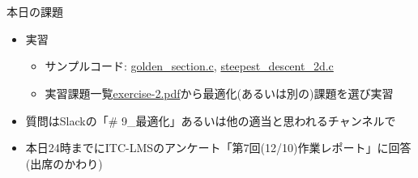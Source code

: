 \documentclass[10pt,dvipdfmx]{beamer}
\begin{document}
\section{}



\begin{frame}[t]{本日の課題}
  \begin{itemize}
  \item 実習
    \begin{itemize}
    \item サンプルコード: \href{https://github.com/todo-group/computer-experiments/blob/master/exercise/optimization/golden_section.c}{golden\_section.c}, \href{https://github.com/todo-group/computer-experiments/blob/master/exercise/optimization/steepest_descent_2d.c}{steepest\_descent\_2d.c}
    \item 実習課題一覧\href{https://github.com/todo-group/ComputerExperiments/releases/tag/2021a-computer2}{exercise-2.pdf}から最適化(あるいは別の)課題を選び実習
    \end{itemize}
  \item 質問はSlackの「\# 9\_最適化」あるいは他の適当と思われるチャンネルで
  \item 本日24時までにITC-LMSのアンケート「第7回(12/10)作業レポート」に回答(出席のかわり)
  \end{itemize}
\end{frame}
\end{document}
